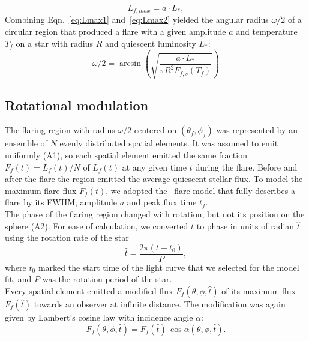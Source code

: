 \documentclass[fleqn,usenatbib,letters]{mnras}%
\begin{document}
\begin{equation}
L_{f,max} = a \cdot L_{*},
\label{eq:Lmax2}
\end{equation}
Combining Eqn.~\ref{eq:Lmax1} and~\ref{eq:Lmax2} yielded the angular radius $\omega/2$ of a circular region that produced a flare with a given amplitude $a$ and temperature $T_f$ on a star with radius $R$ and quiescent luminosity $L_{*}$:
\begin{equation}
\omega/2 = \arcsin\left(\sqrt{\dfrac{a \cdot L_{*}}{\pi R^2 F_{f,s}(T_f)}}\right)
\end{equation}
\subsection{Rotational modulation}
\label{ssec:rotationalmodulation}
The flaring region with radius $\omega/2$ centered on $(\theta_{f},\phi_{f})$ was represented by an ensemble of $N$ evenly distributed spatial elements. It was assumed to emit uniformly (A1), so each spatial element emitted the same fraction $F_f(t)=L_f(t)/N$ of $L_f(t)$ at any given time $t$ during the flare. Before and after the flare the region emitted the average quiescent stellar flux. To model the maximum flare flux $F_f(t)$, we adopted the~\citet{davenport2014} flare model that fully describes a flare by its FWHM, amplitude $a$ and peak flux time $t_f$.
\\
The phase of the flaring region changed with rotation, but not its position on the sphere (A2). %
For ease of calculation, we converted $t$ to phase in units of radian $\hat t$ using the rotation rate of the star
\begin{equation}
\hat t = \dfrac{2\pi(t - t_{0})}{P},
\end{equation}
where $t_{0}$ marked the start time of the light curve that we selected for the model fit, and $P$ was the rotation period of the star.
\\
Every spatial element emitted a modified flux $F_f(\theta,\phi,\hat t)$ of its maximum flux $F_f(\hat t)$ towards an observer at infinite distance. The modification was again given by Lambert's cosine law with incidence angle $\alpha$:
\begin{equation}
   F_f(\theta,\phi,\hat t) = F_{f}(\hat t)\,\cos\alpha(\theta,\phi,\hat t).
 	\label{eq:lambert1}
\end{equation}
\end{document}
